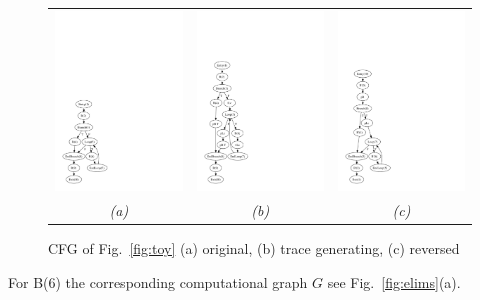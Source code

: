 \documentclass[11pt]{article}
\newcommand{\reffig}[1]{{Fig.~\ref{#1}}}
\begin{document}
\begin{figure}[ht]
  \centering
  \begin{tabular}{ccc}
    \includegraphics[width=.25\textwidth]{cfg_ts}
    &
    \includegraphics[width=.25\textwidth]{cfg_tape}
    &
    \includegraphics[width=.25\textwidth]{cfg_adj}
    \\
    \em (a) & \em (b) & \em (c)
  \end{tabular}
  \caption{CFG of \reffig{fig:toy} (a) original, (b) trace generating, (c) reversed}\label{fig:cfg}
\end{figure}
For B(6) the corresponding computational graph $G$  see 
\reffig{fig:elims}(a).  
\end{document}
